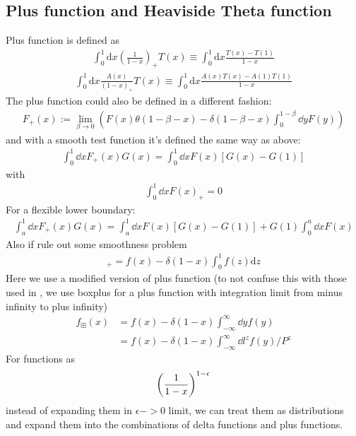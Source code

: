 \documentclass{article}
\begin{document}
\subsection{Plus function and Heaviside Theta function}
Plus function is defined as\cite{Collins2009}
\begin{align}
	\int_{0}^{1} \mathrm{d} x\left(\frac{1}{1-x}\right)_{+} T(x) \equiv \int_{0}^{1} \mathrm{d} x \frac{T(x)-T(1)}{1-x}
\end{align}
\begin{align}
	\int_{0}^{1} \mathrm{d} x \frac{A(x)}{(1-x)_{+}} T(x) \equiv \int_{0}^{1} \mathrm{d} x \frac{A(x) T(x)-A(1) T(1)}{1-x}
\end{align}
The plus function could also be defined in a different fashion:
\begin{align}
	F_{+}(x):=\lim _{\beta \rightarrow 0}\left(F(x) \theta(1-\beta-x)-\delta(1-\beta-x) \int_{0}^{1-\beta} \dd y F(y)\right)
\end{align}
and with a smooth test function it's defined the same way as above:
\begin{align}
	\int_{0}^{1} \dd x F_{+}(x) G(x)=\int_{0}^{1} \dd x F(x)[G(x)-G(1)]
\end{align}
with
\begin{align}
	\int_{0}^{1} \dd x F(x)_{+}=0
\end{align}
For a flexible lower boundary:
\begin{align}
	\int_{a}^{1} \dd x F_{+}(x) G(x)=\int_{a}^{1} \dd x F(x)[G(x)-G(1)]+G(1) \int_{0}^{a} \dd x F(x)
\end{align}
Also if rule out some smoothness problem
\begin{align}
	[f(x)]_{+}=f(x)-\delta(1-x) \int_{0}^{1} f(z) \mathrm{d} z
\end{align}
Here we use a modified version of plus function (to not confuse this with those used in \cite{Stewart:2017tvs}, we use boxplus for a plus function with integration limit from minus infinity to plus infinity)
\begin{align}
	f_{\boxplus}(x) & =f(x)-\delta(1-x)\int_{-\infty}^\infty\dd yf(y)       \\
	                & =f(x)-\delta(1-x)\int_{-\infty}^\infty\dd l^zf(y)/P^z
\end{align}
For functions as
\begin{align}
	\pqty{\frac{1}{1-x}}^{1-\epsilon}
\end{align}
instead of expanding them in $\epsilon->0$ limit, we can treat them as distributions and expand them into the combinations of delta functions and plus functions.
\end{document}
